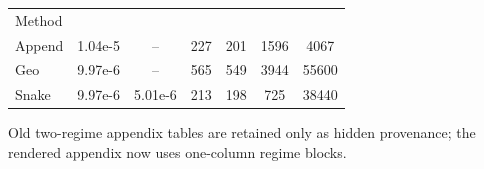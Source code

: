 \documentclass[
  reprint,
  amsmath,
  amssymb,
  aps,
  pra,
  nofootinbib,
  superscriptaddress,
  floatfix
]{revtex4-2}
\newcommand{\metrichead}[1]{\makebox[0.061\textwidth][c]{#1}}
\begin{document}
\noindent\begin{minipage}{\columnwidth}
\begin{center}
\scriptsize
\setlength{\tabcolsep}{1.1pt}
\renewcommand{\arraystretch}{1.02}
\begin{ruledtabular}
\begin{tabular}{p{}cccccc}
Method & \metrichead{$|\Delta E|$} & \metrichead{$1-F$} & \metrichead{$N_{2q}$} & \metrichead{$D_{2q}$} & \metrichead{$D_c$} & \metrichead{$S$}\\
\colrule
Append & 1.04e-5 & -- & 227 & 201 & 1596 & 4067\\
Geo & 9.97e-6 & -- & 565 & 549 & 3944 & 55600\\
Snake & 9.97e-6 & 5.01e-6 & 213 & 198 & 725 & 38440\\
\end{tabular}
\end{ruledtabular}
\end{center}
\end{minipage}
\par\addvspace{1.0ex}

\iffalse
Old two-regime appendix tables are retained only as hidden provenance; the rendered
appendix now uses one-column regime blocks.
\clearpage
\end{document}
